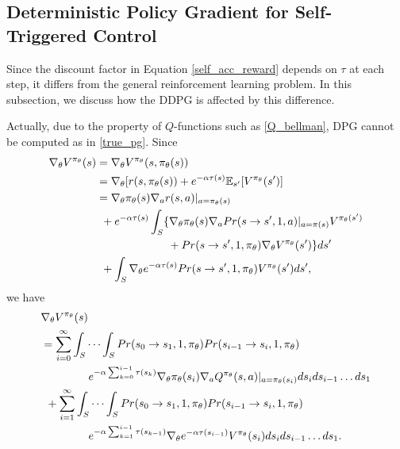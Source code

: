 \documentclass[english, dvipdfmx]{ampmt}             %
\newcommand{\expect}{\mathbb{E}}
\begin{document}
\subsection{Deterministic Policy Gradient for Self-Triggered Control}
Since the discount factor in Equation \eqref{self_acc_reward} depends on $\tau$ at each step, it differs from the general reinforcement learning problem. In this subsection, we discuss how the DDPG is affected by this difference. \par
Actually, due to the property of $Q$-functions such as \eqref{Q_bellman}, DPG cannot be computed as in \eqref{true_pg}. Since 
\begin{align}
	\nabla_{\theta}V^{\pi_{\theta}}(s) &= \nabla_{\theta}V^{\pi_{\theta}}(s, \pi_{\theta}(s)) \nonumber \\
	&= \nabla_{\theta}[r(s, \pi_{\theta}(s)) + e^{-\alpha\tau(s)}\expect_{s^{\prime}}[V^{\pi_{\theta}}(s^{\prime})] \nonumber \\
	&= \nabla_{\theta}\pi_{\theta}(s)\nabla_ar(s,a)|_{a=\pi_{\theta}(s)} \nonumber \\
	&\hspace{1ex}+e^{-\alpha\tau(s)}\int_{S}\{\nabla_{\theta}\pi_{\theta}(s)\nabla_aPr(s\to s^{\prime},1,a)|_{a=\pi(s)}V^{\pi_{\theta}(s^{\prime})}\nonumber\\
	&\hspace{15ex}+Pr(s\to s^{\prime}, 1, \pi_{\theta})\nabla_{\theta}V^{\pi_{\theta}}(s^{\prime})\}ds^{\prime}\nonumber \\
	&\hspace{1ex}+\int_{S}\nabla_{\theta}e^{-\alpha\tau(s)}Pr(s\to s^{\prime}, 1, \pi_{\theta})V^{\pi_{\theta}}(s^{\prime})ds^{\prime},
\end{align}
we have
\begin{align}
	&\nabla_{\theta}V^{\pi_{\theta}}(s) \nonumber \\
	&= \sum_{i=0}^{\infty}\int_{S}\cdots\int_{S}Pr(s_0\to s_1,1,\pi_{\theta})Pr(s_{i-1}\to s_i,1,\pi_{\theta})\nonumber\\
	&\hspace{10ex}e^{-\alpha\sum_{k=0}^{i-1}\tau(s_k)}\nabla_{\theta}\pi_{\theta}(s_i)\nabla_aQ^{\pi_{\theta}}(s,a)|_{a=\pi_{\theta}(s_i)}ds_ids_{i-1}\ldots ds_1\nonumber\\
	&\hspace{1ex}+\sum_{i=1}^{\infty}\int_{S}\cdots\int_{S}Pr(s_0\to s_1,1,\pi_{\theta})Pr(s_{i-1}\to s_i,1,\pi_{\theta})\nonumber\\
	&\hspace{10ex}e^{-\alpha\sum_{k=1}^{i-1}\tau(s_{k-1})}\nabla_{\theta}e^{-\alpha\tau(s_{i-1})}V^{\pi_{\theta}}(s_i)ds_ids_{i-1}\ldots ds_1.
\end{align}
\end{document}
